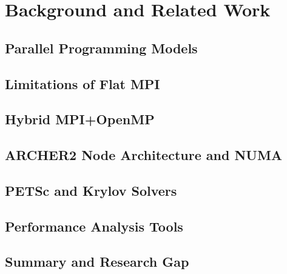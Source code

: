 \chapter{Background and Related Work}
\label{ch:background}

\section{Parallel Programming Models}
\label{sec:models}

\section{Limitations of Flat MPI}
\label{sec:flatmpi}

\section{Hybrid MPI+OpenMP}
\label{sec:hybrid}

\section{ARCHER2 Node Architecture and NUMA}
\label{sec:archer2}

\section{PETSc and Krylov Solvers}
\label{sec:petsc-krylov}

\section{Performance Analysis Tools}
\label{sec:tools}

\section{Summary and Research Gap}
\label{sec:gap}
